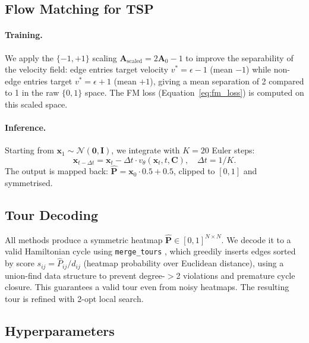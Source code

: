 \documentclass[11pt,a4paper]{article}
\begin{document}
\subsection{Flow Matching for TSP}
\label{sec:fm_method}
\paragraph{Training.}
We apply the \(\{-1,+1\}\) scaling $\mathbf{A}_\text{scaled} = 2\mathbf{A}_0 - 1$
to improve the separability of the velocity field: edge entries target velocity
$v^* = \epsilon - 1$ (mean $-1$) while non-edge entries target $v^* = \epsilon + 1$
(mean $+1$), giving a mean separation of 2 compared to 1 in the raw $\{0,1\}$ space.
The FM loss (Equation~\ref{eq:fm_loss}) is computed on this scaled space.

\paragraph{Inference.}
Starting from $\mathbf{x}_1 \sim \mathcal{N}(\mathbf{0},\mathbf{I})$, we integrate
with $K=20$ Euler steps:
\begin{equation}
  \mathbf{x}_{t-\Delta t} = \mathbf{x}_t - \Delta t \cdot v_\theta(\mathbf{x}_t, t, \mathbf{C}),
  \quad \Delta t = 1/K.
\end{equation}
The output is mapped back: $\hat{\mathbf{P}} = \mathbf{x}_0 \cdot 0.5 + 0.5$,
clipped to $[0,1]$ and symmetrised.

\subsection{Tour Decoding}
\label{sec:decoding}
All methods produce a symmetric heatmap $\hat{\mathbf{P}} \in [0,1]^{N\times N}$.
We decode it to a valid Hamiltonian cycle using \texttt{merge\_tours}
\citep{sun2023difusco}, which greedily inserts edges sorted by score
$s_{ij} = \hat{P}_{ij} / d_{ij}$ (heatmap probability over Euclidean distance),
using a union-find data structure to prevent degree-$>$2 violations and premature
cycle closure. This guarantees a valid tour even from noisy heatmaps.
The resulting tour is refined with 2-opt local search.

\subsection{Hyperparameters}
\end{document}
